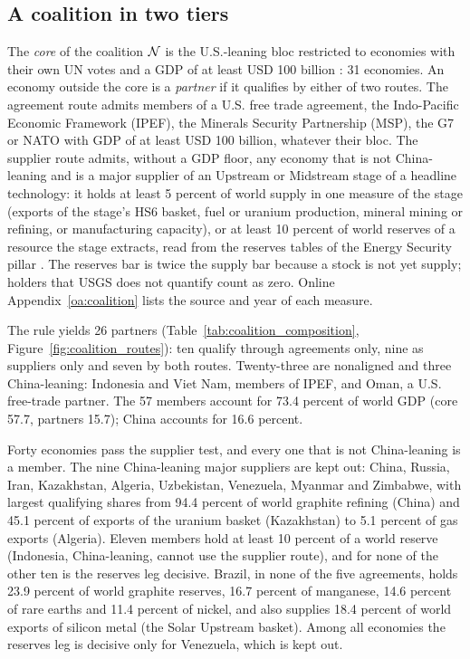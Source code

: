 \subsection{A coalition in two tiers}\label{subsec:coalition_tiers}

The \emph{core} of the coalition $\mathcal{N}$ is the U.S.-leaning bloc restricted to economies with
their own UN votes and a GDP of at least USD 100 billion \citep[2025;][]{worldbank2026wdi}: 31
economies. An economy outside the core is a \emph{partner} if it qualifies by either of two routes.
The agreement route admits members of a U.S. free trade agreement, the Indo-Pacific Economic
Framework (IPEF), the Minerals Security Partnership (MSP), the G7 or NATO with GDP of at least USD
100 billion, whatever their bloc. The supplier route admits, without a GDP floor, any economy that is
not China-leaning and is a major supplier of an Upstream or Midstream stage of a headline
technology: it holds at least 5 percent of world supply in one measure of the stage (exports of the
stage's HS6 basket, fuel or uranium production, mineral mining or refining, or manufacturing
capacity), or at least 10 percent of world reserves of a resource the stage extracts, read from
the reserves tables of the Energy Security pillar \citep{usgs2026mcs,ei2026statistical,oecdnea2026uranium}.
The reserves bar is twice the supply bar because a stock is not yet supply; holders that USGS does
not quantify count as zero. Online Appendix~\ref{oa:coalition} lists the source and year of each
measure.

The rule yields 26 partners (Table~\ref{tab:coalition_composition},
Figure~\ref{fig:coalition_routes}): ten qualify through agreements only, nine as suppliers only and
seven by both routes. Twenty-three are nonaligned and three China-leaning: Indonesia and Viet Nam,
members of IPEF, and Oman, a U.S. free-trade partner. The 57 members account for 73.4 percent of
world GDP (core 57.7, partners 15.7); China accounts for 16.6 percent.

Forty economies pass the supplier test, and every one that is not China-leaning is a member. The
nine China-leaning major suppliers are kept out: China, Russia, Iran, Kazakhstan, Algeria,
Uzbekistan, Venezuela, Myanmar and Zimbabwe, with largest qualifying shares from 94.4 percent of
world graphite refining (China) and 45.1 percent of exports of the uranium basket (Kazakhstan) to 5.1
percent of gas exports (Algeria). Eleven members hold at least 10 percent of a world reserve (Indonesia,
China-leaning, cannot use the supplier route), and for none of the other ten is the reserves leg
decisive. Brazil, in none of the five agreements, holds 23.9 percent of
world graphite reserves, 16.7 percent of manganese, 14.6 percent of rare earths and 11.4 percent of
nickel, and also supplies 18.4 percent of world exports of silicon metal (the Solar Upstream basket).
Among all economies the reserves leg is decisive only for Venezuela, which is kept out.

